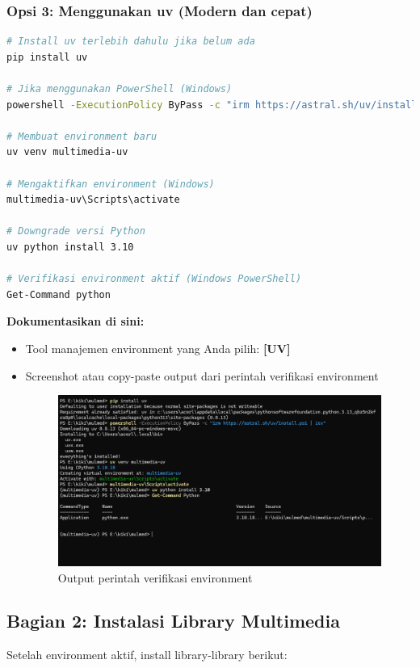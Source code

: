 \documentclass[11pt,a4paper]{article}
\begin{document}
\subsubsection{Opsi 3: Menggunakan uv (Modern dan cepat)}
\begin{lstlisting}[language=bash, caption=Membuat environment dengan uv]
# Install uv terlebih dahulu jika belum ada
pip install uv

# Jika menggunakan PowerShell (Windows)
powershell -ExecutionPolicy ByPass -c "irm https://astral.sh/uv/install.ps1 | iex"

# Membuat environment baru
uv venv multimedia-uv

# Mengaktifkan environment (Windows)
multimedia-uv\Scripts\activate

# Downgrade versi Python
uv python install 3.10

# Verifikasi environment aktif (Windows PowerShell)
Get-Command python
\end{lstlisting}

\textbf{Dokumentasikan di sini:}
\begin{itemize}
    \item Tool manajemen environment yang Anda pilih: \textbf{[UV]}
    \item Screenshot atau copy-paste output dari perintah verifikasi environment
    \begin{figure}[h!]
    \centering
    \includegraphics[scale = 0.5]{Figure/Install-UV1.png}
    \caption{Output perintah verifikasi environment}
    \vspace{0.1cm}
    \end{figure}
\end{itemize}

\subsection{Bagian 2: Instalasi Library Multimedia}
Setelah environment aktif, install library-library berikut:
\end{document}
